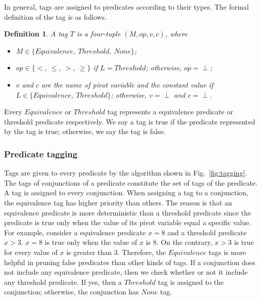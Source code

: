 \documentclass[preprint]{sigplanconf}
\newtheorem{definition}{Definition}
\begin{document}
In general, tags are assigned to predicates according to their types. The 
formal definition of the tag is as follows. 
\begin{definition}
   A tag $T$ is a four-tuple $(M, op, v, c)$, where  
   \begin{itemize}
      \item $M \in \{Equivalence,\ Threshold,\ None\}$;
      \item $op \in \{<,\ \le,\ >,\ \ge\}$ if $L = Threshold$; otherwise, 
         $op = \perp$;
      \item $v$ and $c$ are the name of pivot variable and the constant
         value if $L \in \{Equivalence,\ Threshold\}$; otherwise, $v = \perp$
         and $c = \perp$.
   \end{itemize}
\end{definition}
Every $Equivalence$ or $Threshold$ tag represents a equivalence predicate or
threshold predicate respectively. We say a tag is true if the predicate
represented by the tag is true; otherwise, we say the tag is false. 
\subsubsection{Predicate tagging}
Tags are given to every predicate by the algorithm shown in
Fig.~\ref{fig:tagging}. The tags of conjunctions of a predicate constitute the 
set of tags of the predicate. A tag is assigned to every conjunction. When assigning a 
tag to a conjunction, the equivalence tag has higher priority than others. The
reason is that an equivalence predicate is more deterministic than a threshold 
predicate since the predicate is true only when the value of its pivot variable 
equal a specific value. For example, consider a equivalence predicate $x = 8$
and a threshold predicate $x > 3$. $x = 8$ is true only when the value of $x$
is $8$. On the contrary, $x > 3$ is true for every value of $x$ is greater than
$3$. Therefore, the $Equivalence$ tags is more helpful in
pruning false predicates than other kinds of tags. If a conjunction does not 
include any equivalence predicate, then we check whether or not it 
include any threshold predicate. If yes, then a $Threshold$ tag is assigned 
to the conjunction; otherwise, the conjunction has $None$ tag. 
\end{document}
